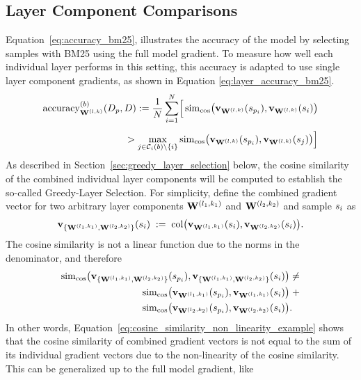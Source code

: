 \subsection{Layer Component Comparisons}
Equation~\ref{eq:accuracy_bm25}, illustrates the accuracy of the model by selecting samples with BM25 using the full model gradient. To measure how well each individual layer performs in this setting, this accuracy is adapted to use single layer component gradients, as shown in Equation \ref{eq:layer_accuracy_bm25}.
\begin{equation}
  \begin{split}
    \operatorname{accuracy}^{(b)}_{\Wlk}(D_{p},D)
    := \frac{1}{N}\sum_{i=1}^{N}
        \Bigl[\,
          \simcos\bigl(\vXspi[\Wlk],\vXsi[\Wlk]\bigr)
          \\[4pt]            %
    \quad>
          \max_{j\in\mathcal{C}_{i}(b)\setminus\{i\}}
          \simcos\bigl(\vXspi[\Wlk],\vXsj[\Wlk]\bigr)
        \Bigr]
  \end{split}
  \label{eq:layer_accuracy_bm25}
\end{equation}
As described in Section~\ref{sec:greedy_layer_selection} below, the cosine similarity of the combined individual layer components will be computed to establish the so-called Greedy-Layer Selection. For simplicity, define the combined gradient vector for two arbitrary layer components $\Wlonekone$ and $\Wltwoktwo$ and sample $\si$ as
\begin{equation}
\vXsi[\{ \Wlonekone, \Wltwoktwo \}]
\;:=\;
\operatorname{col}\bigl( \vXsi[\Wlonekone], \vXsi[\Wltwoktwo] \bigr).
\end{equation}
The cosine similarity is not a linear function due to the norms in the denominator, and therefore
\begin{equation}
    \begin{split}
        \simcos\bigl(\vXspi[\{ \Wlonekone, \Wltwoktwo \}], \vXsi[\{ \Wlonekone, \Wltwoktwo \}] \bigr) & \neq \\
        \simcos\bigl(\vXspi[\Wlonekone], \vXsi[\Wlonekone] \bigr) & \; + \\ \simcos\bigl(\vXspi[\Wltwoktwo], \vXsi[\Wltwoktwo] \bigr) & .
    \end{split}
    \label{eq:cosine_similarity_non_linearity_example}
\end{equation}
In other words, Equation~\ref{eq:cosine_similarity_non_linearity_example} shows that the cosine similarity of combined gradient vectors is not equal to the sum of its individual gradient vectors due to the non-linearity of the cosine similarity. This can be generalized up to the full model gradient, like
